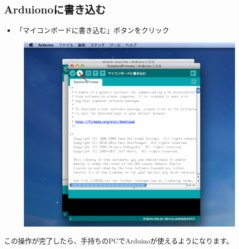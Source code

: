 \documentclass[11pt,a4paper]{jarticle}
\begin{document}
\newpage

\subsection{Arduionoに書き込む}
\begin{itemize}
\item 「マイコンボードに書き込む」ボタンをクリック
\end{itemize}

 \begin{figure}[h]
 \centering
 \includegraphics[width=0.63\columnwidth]{img/firmata6.eps}
\end{figure}

この操作が完了したら、手持ちのPCでArduinoが使えるようになります。


\end{document}
